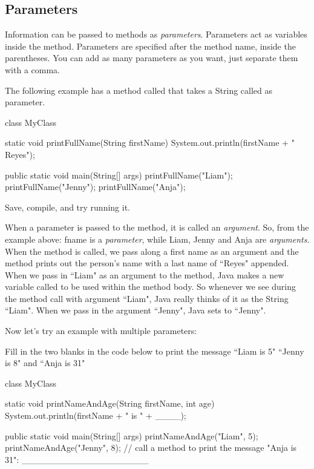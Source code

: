 \subsection{Parameters} 

Information can be passed to methods as \emph{parameters}. Parameters act as variables inside the method. Parameters are specified after the method name, inside the parentheses. You can add as many parameters as you want, just separate them with a comma.

The following example has a method called  that takes a String called  as parameter. 

\begin{code}
class MyClass {
  static void printFullName(String firstName) {
    System.out.println(firstName + " Reyes");
  }

  public static void main(String[] args) {
    printFullName("Liam");
    printFullName("Jenny");
    printFullName("Anja");
  }
}
\end{code}

Save, compile, and try running it. 

When a parameter is passed to the method, it is called an \emph{argument}. So, from the example above: fname is a \emph{parameter}, while Liam, Jenny and Anja are \emph{arguments}. When the method is called, we pass along a first name as an argument and the method prints out the person's name with a last name of ``Reyes" appended. When we pass in ``Liam" as an argument to the  method, Java makes a new variable called  to be used within the  method body. So whenever we see  during the method call with argument ``Liam", Java really thinks of it as the String ``Liam". When we pass in the argument ``Jenny", Java sets  to ``Jenny". 

Now let's try an example with multiple parameters:

\begin{example}

Fill in the two blanks in the code below to print the message ``Liam is 5" ``Jenny is 8" and ``Anja is 31"
\begin{code}
class MyClass {
  static void printNameAndAge(String firstName, int age) {
    System.out.println(firstName + " is " + ____);
  }

  public static void main(String[] args) {
    printNameAndAge("Liam", 5);
    printNameAndAge("Jenny", 8);
    // call a method to print the message "Anja is 31":
    ____________________ 
  }
}
\end{code}
\end{example}

